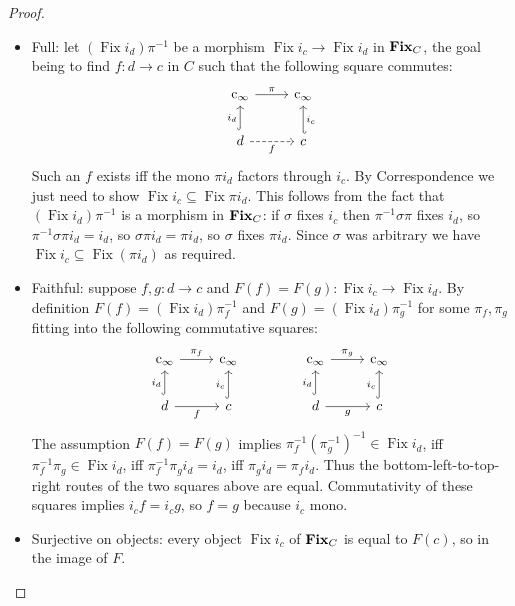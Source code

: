 \documentclass[
  sigconf,
  screen, ]{acmart}
\theoremstyle{definition}
\newcommand\Fix{\operatorname{Fix}}
\newcommand\cinfty{{{\rm c}_\infty}}
\newcommand\subgrpcat{{\bf Fix}}
\begin{document}
\begin{proof}
\begin{itemize}
\[\begin{tikzcd}
    \end{tikzcd}\]
    We need $F(gf) = (\Fix{i_e})\pi_{fg}^{-1} = (\Fix{i_e})\pi_f^{-1}\pi_g^{-1} = F(f)F(g)$.
    Since in general two cosets $gH,hH$ are equal iff $gh^{-1}\in H$,
    this amounts to showing $(\pi_f^{-1}\pi_g^{-1})(\pi_{fg}^{-1})^{-1}\in \Fix{i_e}$.
    The commutativity of the above rectangles implies
    \[ 
       (\pi_f^{-1}\pi_g^{-1})(\pi_{fg}^{-1})^{-1} i_e
       = \pi_f^{-1}\pi_g^{-1}\pi_{fg} i_e
       = \pi_f^{-1}\pi_g^{-1} i_c g f
       = \pi_f^{-1}\pi_g^{-1} \pi_g\pi_f i_e
       = i_e
        \]
    so $(\pi_f^{-1}\pi_g^{-1})(\pi_{fg}^{-1})^{-1}$ fixes $i_e$ as required.
  \item Full:
    let $(\Fix{i_d})\pi^{-1}$ be a morphism
    $\Fix{i_c}\to \Fix{i_d}$ in $\subgrpcat_C$,
    the goal being to find $f : d\to c$ in $C$
    such that the following square commutes:
    \[
    \begin{tikzcd}
    \cinfty \arrow[r, "\pi"]                 & \cinfty                    \\
    d \arrow[u, "i_d", hook] \arrow[r, "f"', dashed] & c \arrow[u, "i_c"', hook']
    \end{tikzcd}\]
    Such an $f$ exists iff the mono $\pi i_d$ factors through $i_c$.
    By Correspondence we just need to show $\Fix{i_c}\subseteq\Fix{\pi i_d}$.
    This follows from the fact that $(\Fix i_d)\pi^{-1}$ is a morphism
    in $\subgrpcat_C$:
    if $\sigma$ fixes $i_c$ then
    $\pi^{-1} \sigma \pi$ fixes $i_d$,
    so $\pi^{-1}\sigma\pi i_d = i_d$,
    so $\sigma \pi i_d = \pi i_d$,
    so $\sigma$ fixes $\pi i_d$.
    Since $\sigma$ was arbitrary we have
    $\Fix{i_c}\subseteq \Fix{(\pi i_d)}$ as required.
  \item Faithful:
    suppose $f,g : d\to c$ and $F(f) = F(g) : \Fix{i_c}\to \Fix{i_d}$.
    By definition $F(f) = (\Fix{i_d})\pi_f^{-1}$
    and $F(g) = (\Fix{i_d})\pi_g^{-1}$
    for some $\pi_f,\pi_g$ fitting into the following commutative squares:
    \[\begin{tikzcd}
    \cinfty \arrow[r, "\pi_f"]               & \cinfty                  \\
    d \arrow[r, "f"'] \arrow[u, "i_d", hook] & c \arrow[u, "i_c", hook]
    \end{tikzcd}
    \qquad\qquad 
    \begin{tikzcd}
    \cinfty \arrow[r, "\pi_g"]               & \cinfty                  \\
    d \arrow[r, "g"'] \arrow[u, "i_d", hook] & c \arrow[u, "i_c", hook]
    \end{tikzcd}
    \]
    The assumption $F(f) = F(g)$ implies $\pi_f^{-1}(\pi_g^{-1})^{-1}\in \Fix{i_d}$,
    iff $\pi_f^{-1}\pi_g\in\Fix{i_d}$,
    iff $\pi_f^{-1}\pi_g i_d = i_d$, iff $\pi_g i_d = \pi_f i_d$.
    Thus the bottom-left-to-top-right routes of the two squares above
    are equal. Commutativity of these squares implies
    $i_cf = i_c g$, so $f=g$ because $i_c$ mono.
  \item Surjective on objects:
    every object
    $\Fix{i_c}$ of $\subgrpcat_C$
    is equal to $F(c)$, so in the image of $F$.
  \end{itemize}
\end{proof}
\end{document}
